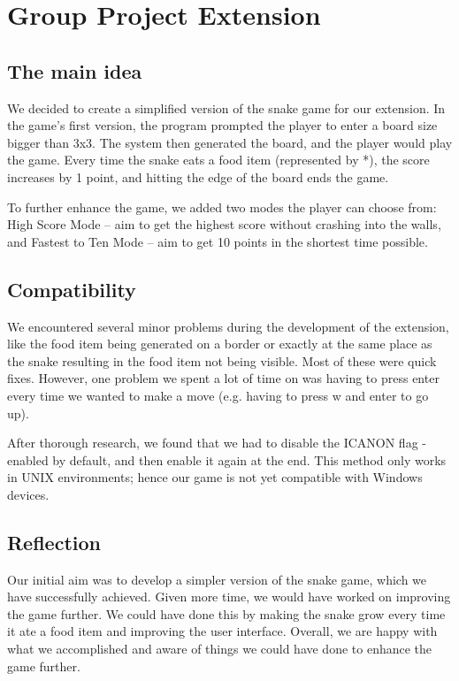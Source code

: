 \documentclass[11pt]{article}
\begin{document}
\section{Group Project Extension}
\subsection{The main idea}
We decided to create a simplified version of the snake game for our extension. In the game's first version, the program prompted the player to enter a board size bigger than 3x3. The system then generated the board, and the player would play the game. Every time the snake eats a food item (represented by *), the score increases by 1 point, and hitting the edge of the board ends the game.

To further enhance the game, we added two modes the player can choose from: High Score Mode – aim to get the highest score without crashing into the walls, and Fastest to Ten Mode – aim to get 10 points in the shortest time possible. 

\subsection{Compatibility}
We encountered several minor problems during the development of the extension, like the food item being generated on a border or exactly at the same place as the snake resulting in the food item not being visible. Most of these were quick fixes. However, one problem we spent a lot of time on was having to press enter every time we wanted to make a move (e.g. having to press w and enter to go up). 

After thorough research, we found that we had to disable the ICANON flag - enabled by default, and then enable it again at the end. This method only works in UNIX environments; hence our game is not yet compatible with Windows devices.

\subsection{Reflection}
Our initial aim was to develop a simpler version of the snake game, which we have successfully achieved. Given more time, we would have worked on improving the game further. We could have done this by making the snake grow every time it ate a food item and improving the user interface. Overall, we are happy with what we accomplished and aware of things we could have done to enhance the game further. 
\end{document}
